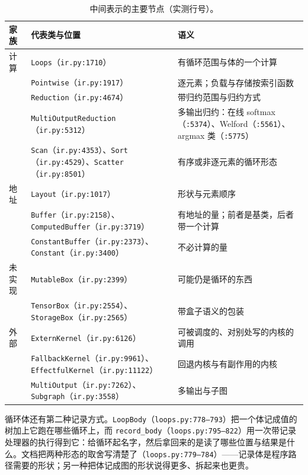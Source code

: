 \begin{table}[H]
\centering
\caption{中间表示的主要节点（实测行号）。}
\label{tab:be:ir}
\small
\begin{tabular}{lll}
\toprule
家族 & 代表类与位置 & 语义 \\
\midrule
计算 & \texttt{Loops}（\texttt{ir.py:1710}） & 有循环范围与体的一个计算 \\
 & \texttt{Pointwise}（\texttt{ir.py:1917}） & 逐元素；负载与存储按索引函数 \\
 & \texttt{Reduction}（\texttt{ir.py:4674}） & 带归约范围与归约方式 \\
 & \texttt{MultiOutputReduction}（\texttt{ir.py:5312}） & 多输出归约：在线 softmax（\texttt{:5374}）、Welford（\texttt{:5561}）、argmax 类（\texttt{:5775}） \\
 & \texttt{Scan}（\texttt{ir.py:4353}）、\texttt{Sort}（\texttt{ir.py:4529}）、\texttt{Scatter}（\texttt{ir.py:8501}） & 有序或非逐元素的循环形态 \\
\hline
地址 & \texttt{Layout}（\texttt{ir.py:1017}） & 形状与元素顺序 \\
 & \texttt{Buffer}（\texttt{ir.py:2158}）、\texttt{ComputedBuffer}（\texttt{ir.py:3719}） & 有地址的量；前者是基类，后者带一个计算 \\
 & \texttt{ConstantBuffer}（\texttt{ir.py:2373}）、\texttt{Constant}（\texttt{ir.py:3400}） & 不必计算的量 \\
\hline
未实现 & \texttt{MutableBox}（\texttt{ir.py:2399}） & 可能仍是循环的东西 \\
 & \texttt{TensorBox}（\texttt{ir.py:2554}）、\texttt{StorageBox}（\texttt{ir.py:2565}） & 带盒子语义的包装 \\
\hline
外部 & \texttt{ExternKernel}（\texttt{ir.py:6126}） & 可被调度的、对别处写的内核的调用 \\
 & \texttt{FallbackKernel}（\texttt{ir.py:9961}）、\texttt{EffectfulKernel}（\texttt{ir.py:11122}） & 回退内核与有副作用的内核 \\
 & \texttt{MultiOutput}（\texttt{ir.py:7262}）、\texttt{Subgraph}（\texttt{ir.py:3558}） & 多输出与子图 \\
\bottomrule
\end{tabular}
\end{table}

循环体还有第二种记录方式。\texttt{LoopBody}（\texttt{loops.py:778--793}）把一个体记成值的树加上它跑在哪些循环上，而 \texttt{record\_body}（\texttt{loops.py:795--822}）用一次带记录处理器的执行得到它：给循环起名字，然后拿回来的是读了哪些位置与结果是什么。文档把两种形态的取舍写清楚了（\texttt{loops.py:779--784}）——记录体是程序路径需要的形状；另一种把体记成图的形状说得更多、拆起来也更贵。

